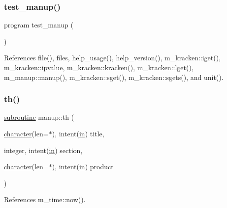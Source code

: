 \mbox{\label{manup_8f90_a5941828c1341a0298a7b0c0c5789ff35}} 
\subsubsection{\texorpdfstring{test\+\_\+manup()}{test\_manup()}}
{\footnotesize\ttfamily program test\+\_\+manup (\begin{DoxyParamCaption}{ }\end{DoxyParamCaption})}



References file(), files, help\+\_\+usage(), help\+\_\+version(), m\+\_\+kracken\+::iget(), m\+\_\+kracken\+::ipvalue, m\+\_\+kracken\+::kracken(), m\+\_\+kracken\+::lget(), m\+\_\+manup\+::manup(), m\+\_\+kracken\+::sget(), m\+\_\+kracken\+::sgets(), and unit().

\mbox{\label{manup_8f90_ad056917b9c1db52352c327beadced6d0}} 
\subsubsection{\texorpdfstring{th()}{th()}}
{\footnotesize\ttfamily \hyperlink{M__stopwatch_83_8txt_acfbcff50169d691ff02d4a123ed70482}{subroutine} manup\+::th (\begin{DoxyParamCaption}\item[{\hyperlink{option__stopwatch_83_8txt_abd4b21fbbd175834027b5224bfe97e66}{character}(len=$\ast$), intent(\hyperlink{M__journal_83_8txt_afce72651d1eed785a2132bee863b2f38}{in})}]{title,  }\item[{integer, intent(\hyperlink{M__journal_83_8txt_afce72651d1eed785a2132bee863b2f38}{in})}]{section,  }\item[{\hyperlink{option__stopwatch_83_8txt_abd4b21fbbd175834027b5224bfe97e66}{character}(len=$\ast$), intent(\hyperlink{M__journal_83_8txt_afce72651d1eed785a2132bee863b2f38}{in})}]{product }\end{DoxyParamCaption})}



References m\+\_\+time\+::now().

